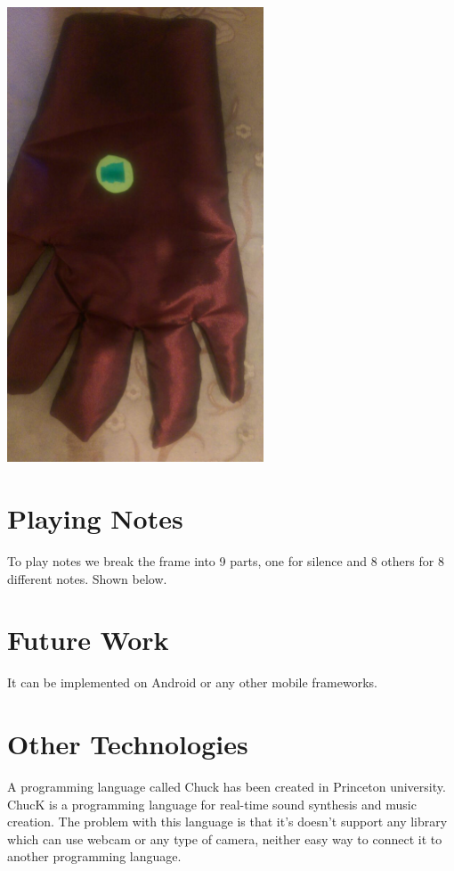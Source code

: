 \documentclass{report}
\begin{document}
\begin{center}
	\includegraphics[width=3in]{Object8.jpg}
\end{center}

\section{Playing Notes}
To play notes we break the frame into 9 parts, one for silence and 8 others for 8 different notes. Shown below.


\section{Future Work}
It can be implemented on Android or any other mobile frameworks.
\section{Other Technologies}
A programming language called Chuck has been created in Princeton university. ChucK is a programming language for real-time sound synthesis and music creation. The problem with this language is that it's doesn't support any library which can use webcam or any type of camera, neither easy way to connect it to another programming language.


\end{document}
